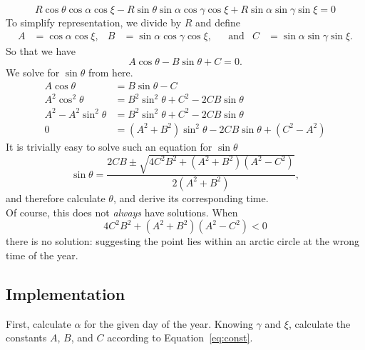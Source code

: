 \documentclass[12pt,a4paper]{article}
\begin{document}
\begin{equation}
R\cos\theta\cos\alpha\cos\xi -R \sin\theta\sin\alpha\cos\gamma\cos\xi + R\sin\alpha\sin\gamma\sin\xi = 0
\end{equation}
To simplify representation, we divide by \(R\) and define
\begin{align}\label{eq:const}
A&= \cos\alpha\cos\xi, & B&= \sin\alpha\cos\gamma\cos\xi, & &\text{and} & C&=\sin\alpha\sin\gamma\sin\xi.
\end{align}
So that we have
\begin{equation}
A\cos\theta - B\sin\theta + C = 0.
\end{equation}
We solve for \(\sin\theta\) from here.
\begin{align}
A\cos\theta  &=  B\sin\theta - C \\
A^{2}\cos^{2}\theta  &=  B^{2}\sin^{2}\theta + C^{2} - 2CB\sin\theta \\
A^{2} - A^{2}\sin^{2}\theta  &=  B^{2}\sin^{2}\theta + C^{2} - 2CB\sin\theta \\
0&=  (A^{2} + B^{2})\sin^{2}\theta - 2CB\sin\theta  + (C^{2}-A^{2})
\end{align}
It is trivially easy to solve such an equation for \(\sin\theta\)
\begin{equation}
\sin\theta = \dfrac{2CB \pm \sqrt{4C^{2}B^{2} + (A^{2}+B^{2})(A^{2}-C^{2}) }}{2(A^{2}+B^{2})},
\end{equation}
and therefore calculate \(\theta\), and derive its corresponding time.  \\[10pt]

Of course, this does not \textit{always} have solutions. When 
\begin{equation}\label{eq:test}
4C^{2}B^{2} + (A^{2}+B^{2})(A^{2}-C^{2})  < 0
\end{equation}
there is no solution: suggesting the point lies within an arctic circle at the wrong time of the year.


\subsection{Implementation}
First, calculate \(\alpha\) for the given day of the year. Knowing \(\gamma\) and \(\xi\), calculate the constants \(A\), \(B\), and \(C\) according to Equation~\eqref{eq:const}.\\
\end{document}
